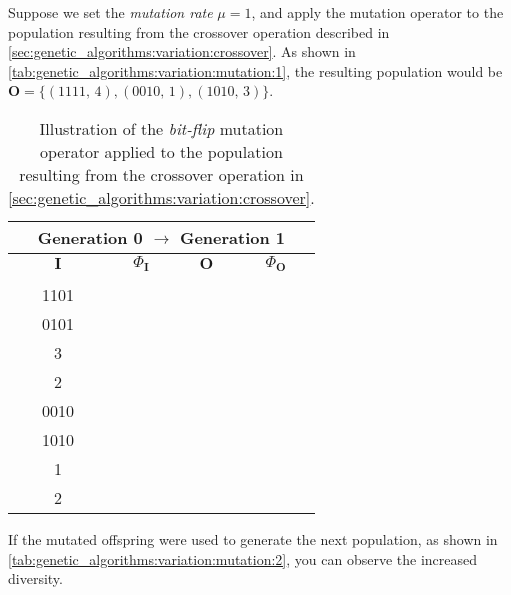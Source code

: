   Suppose we set the \emph{mutation rate} \(\mu = 1\), and apply the mutation 
  operator to the population resulting from the crossover operation described in
  \vref{sec:genetic_algorithms:variation:crossover}.
  As shown in \vref{tab:genetic_algorithms:variation:mutation:1}, the resulting 
  population would be 
  \(\mathbf{O} = \{(1111,\, 4), (0010,\, 1), (1010,\, 3)\}\).

  
  \begin{table}[ht!]
    \centering
    \begin{tabular}{|c|c|c|c|}
      \multicolumn{4}{c}{\textbf{Generation 0} \(\to\) \textbf{Generation 1}} \\
      \hline
      \hline
      \(\mathbf{I}\) & \(\Phi_\mathbf{I}\) & \(\mathbf{O}\) & \(\Phi_\mathbf{O}\) \\
      \hline
      \Gape[2pt][2pt]{\(\begin{bmatrix} 0000 \\ 1101 \\ 0101 \end{bmatrix}\)}
        & \(\begin{bmatrix} 0 \\ 3 \\ 2 \end{bmatrix}\)
        & \(\begin{bmatrix} 1111 \\ 0010 \\ 1010 \end{bmatrix}\) 
        & \(\begin{bmatrix} 4 \\ 1 \\ 2 \end{bmatrix}\) \\[1em]
      \hline
    \end{tabular}
    \caption{
      Illustration of the \emph{bit-flip} mutation operator applied to the 
      population resulting from the crossover operation in 
      \vref{sec:genetic_algorithms:variation:crossover}.
    }
    \label{tab:genetic_algorithms:variation:crossover:mutation}
  \end{table}

  If the mutated offspring were used to generate the next population, as shown 
  in \vref{tab:genetic_algorithms:variation:mutation:2}, you can observe the 
  increased diversity.

